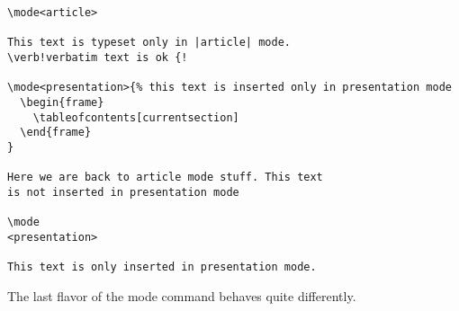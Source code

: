 \begin{command}{\mode{}}
  \example
\begin{Verbatim}
\mode<article>

This text is typeset only in |article| mode.
\verb!verbatim text is ok {!

\mode<presentation>{% this text is inserted only in presentation mode
  \begin{frame}
    \tableofcontents[currentsection]
  \end{frame}
}

Here we are back to article mode stuff. This text
is not inserted in presentation mode

\mode
<presentation>

This text is only inserted in presentation mode.
\end{Verbatim}
\end{command}

The last flavor of the mode command behaves quite differently.

